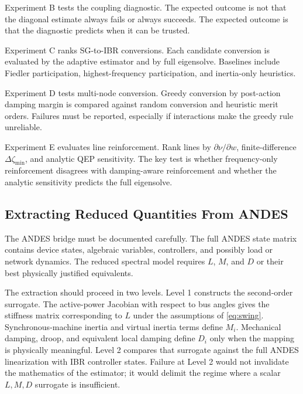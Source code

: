 \documentclass[journal]{IEEEtran}
\begin{document}
Experiment B tests the coupling diagnostic. The expected outcome is not that the diagonal estimate always fails or always succeeds. The expected outcome is that the diagnostic predicts when it can be trusted.

Experiment C ranks SG-to-IBR conversions. Each candidate conversion is evaluated by the adaptive estimator and by full eigensolve. Baselines include Fiedler participation, highest-frequency participation, and inertia-only heuristics.

Experiment D tests multi-node conversion. Greedy conversion by post-action damping margin is compared against random conversion and heuristic merit orders. Failures must be reported, especially if interactions make the greedy rule unreliable.

Experiment E evaluates line reinforcement. Rank lines by $\partial\nu/\partial w$, finite-difference $\Delta\zeta_{\min}$, and analytic QEP sensitivity. The key test is whether frequency-only reinforcement disagrees with damping-aware reinforcement and whether the analytic sensitivity predicts the full eigensolve.

\subsection{Extracting Reduced Quantities From ANDES}

The ANDES bridge must be documented carefully. The full ANDES state matrix contains device states, algebraic variables, controllers, and possibly load or network dynamics. The reduced spectral model requires $L$, $M$, and $D$ or their best physically justified equivalents.

The extraction should proceed in two levels. Level 1 constructs the second-order surrogate. The active-power Jacobian with respect to bus angles gives the stiffness matrix corresponding to $L$ under the assumptions of \eqref{eq:swing}. Synchronous-machine inertia and virtual inertia terms define $M_i$. Mechanical damping, droop, and equivalent local damping define $D_i$ only when the mapping is physically meaningful. Level 2 compares that surrogate against the full ANDES linearization with IBR controller states. Failure at Level 2 would not invalidate the mathematics of the estimator; it would delimit the regime where a scalar $L,M,D$ surrogate is insufficient.
\end{document}
